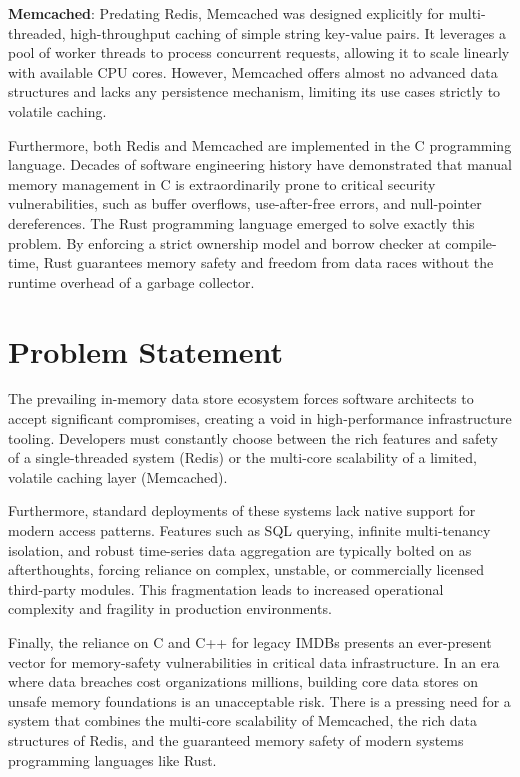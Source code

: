 \textbf{Memcached}: Predating Redis, Memcached was designed explicitly for multi-threaded, high-throughput caching of simple string key-value pairs. It leverages a pool of worker threads to process concurrent requests, allowing it to scale linearly with available CPU cores. However, Memcached offers almost no advanced data structures and lacks any persistence mechanism, limiting its use cases strictly to volatile caching.

Furthermore, both Redis and Memcached are implemented in the C programming language. Decades of software engineering history have demonstrated that manual memory management in C is extraordinarily prone to critical security vulnerabilities, such as buffer overflows, use-after-free errors, and null-pointer dereferences. The Rust programming language emerged to solve exactly this problem. By enforcing a strict ownership model and borrow checker at compile-time, Rust guarantees memory safety and freedom from data races without the runtime overhead of a garbage collector.

\section{Problem Statement}
The prevailing in-memory data store ecosystem forces software architects to accept significant compromises, creating a void in high-performance infrastructure tooling. Developers must constantly choose between the rich features and safety of a single-threaded system (Redis) or the multi-core scalability of a limited, volatile caching layer (Memcached). 

Furthermore, standard deployments of these systems lack native support for modern access patterns. Features such as SQL querying, infinite multi-tenancy isolation, and robust time-series data aggregation are typically bolted on as afterthoughts, forcing reliance on complex, unstable, or commercially licensed third-party modules. This fragmentation leads to increased operational complexity and fragility in production environments.

Finally, the reliance on C and C++ for legacy IMDBs presents an ever-present vector for memory-safety vulnerabilities in critical data infrastructure. In an era where data breaches cost organizations millions, building core data stores on unsafe memory foundations is an unacceptable risk. There is a pressing need for a system that combines the multi-core scalability of Memcached, the rich data structures of Redis, and the guaranteed memory safety of modern systems programming languages like Rust.


